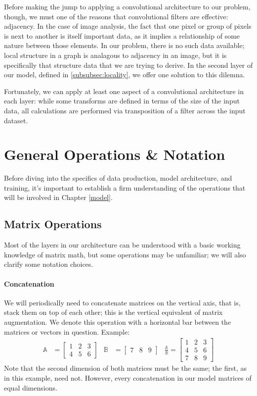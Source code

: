 Before making the jump to applying a convolutional architecture to our problem, 
though, we must one of the reasons that convolutional filters are effective: 
adjacency. In the case of image analysis, the fact that one pixel or group of 
pixels is next to another is itself important data, as it implies a relationship 
of some nature between those elements. In our problem, there is no such data 
available; local structure in a graph is analagous to adjacency in an image, but 
it is specifically that structure data that we are trying to derive. In the 
second layer of our model, defined in \ref{subsubsec:locality}, we offer one 
solution to this dilemna.

Fortunately, we can apply at least one aspect of a convolutional architecture in 
each layer: while some transforms are defined in terms of the size of the input 
data, all calculations are performed via transposition of a filter across the 
input dataset.


\section{General Operations \& Notation}
Before diving into the specifics of data production, model architecture, and 
training, it's important to establish a firm understanding of the operations 
that will be involved in Chapter \ref{model}.

\subsection{Matrix Operations}
\label{subsec:matops}
Most of the layers in our architecture can be understood with a basic working 
knowledge of matrix math, but some operations may be unfamiliar; we will also 
clarify some notation choices.

\paragraph{Concatenation}
We will periodically need to concatenate matrices on the vertical axis, that is, 
stack them on top of each other; this is the vertical equivalent of matrix 
augmentation. We denote this operation with a horizontal bar between the 
matrices or vectors in question. Example:
\begin{align*}
	\mathbb{A} &= \begin{bmatrix}
		1 & 2 & 3\\
		4 & 5 & 6
	\end{bmatrix} &
	\mathbb{B} &= \begin{bmatrix}
		7 & 8 & 9
	\end{bmatrix} &
	\frac{\mathbb{A}}{\mathbb{B}} = \begin{bmatrix}
		1 & 2 & 3\\
		4 & 5 & 6\\
		7 & 8 & 9
	\end{bmatrix}
\end{align*}
Note that the second dimension of both matrices must be the same; the first, as 
in this example, need not. However, every concatenation in our model matrices of 
equal dimensions.

